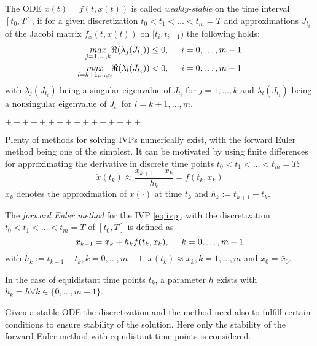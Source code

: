\documentclass[a4paper, 12pt]{scrreprt} %
\begin{document}
\begin{definition}
The \ac{ODE} $\dot x(t) = f\left(t,x(t)\right)$ is called \emph{weakly-stable} on the time interval $[t_0,T]$, if for a given discretization $t_0 < t_1 < \dots < t_m = T$ and approximations $J_{t_i}$ of the Jacobi matrix $f_x(t,x(t))$ on $[t_i, t_{i+1})$ the following holds:
\begin{align}
\underset{j=1,\dots,k}{max} \Re (\lambda_j(J_{t_i})) &\leq  0, \hspace{0.5cm} i=0, \dots, m-1 \\
\underset{l=k+1,\dots,n}{max} \Re (\lambda_l(J_{t_i})) &<  0, \hspace{0.5cm} i=0, \dots, m-1
\label{eq:stab2}
\end{align}
with $\lambda_j(J_{t_i})$ being a singular eigenvalue of $J_{t_i}$ for $j=1,\dots,k$ and $\lambda_l(J_{t_i})$ being a nonsingular eigenvalue of $J_{t_i}$ for $l=k+1,\dots,m$.
\end{definition}

$++++++++++++++++$
\fi

Plenty of methods for solving \acp{IVP} numerically exist, with the forward Euler method being one of the simplest. It can be motivated by using finite differences for approximating the derivative in discrete time points $t_0 < t_1 < \dots < t_m = T$:
\begin{equation*}
\dot x(t_k) \approx \frac{x_{k+1}- x_k}{h_k} = f(t_k, x_k) 
\end{equation*}
$x_k$ denotes the approximation of $x(\cdot)$ at time $t_k$ and $h_k := t_{k+1}-t_k$.

\begin{definition}
The \emph{forward Euler method} for the \ac{IVP} \ref{eq:ivp}, with the discretization $t_0 < t_1 < \dots < t_m = T$ of $[t_0,T]$ is defined as
\begin{equation}
x_{k+1} = x_k + h_k f(t_k,x_k), \hspace{0.5cm} k=0,\dots, m-1
\label{eq:fweul}
\end{equation}
with $h_k := t_{k+1}-t_k, k=0,\dots,m-1$, $x(t_k) \approx x_k, k=1,\dots,m$ and $x_0 = \bar x_0$. 
\end{definition}

In the case of equidistant time points $t_k$, a parameter $h$ exists with $h_k = h \forall k \in \{0,\dots,m-1\}$. 

Given a stable \ac{ODE} the discretization and the method need also to fulfill certain conditions to ensure stability of the solution. Here only the stability of the forward Euler method with equidistant time points is considered.
\end{document}
